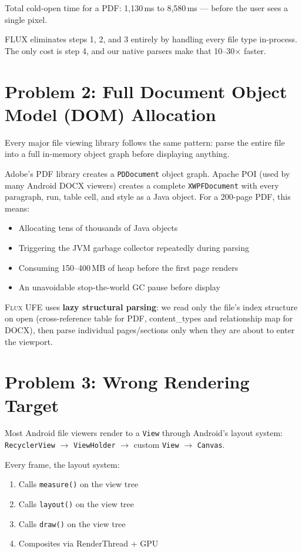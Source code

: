 \documentclass[11pt, a4paper, openright]{report}
\newcommand{\flux}{\textsc{Flux}}
\begin{document}
Total cold-open time for a PDF: 1,130\,ms to 8,580\,ms --- before the user sees a single pixel.

FLUX eliminates steps 1, 2, and 3 entirely by handling every file type in-process. The only cost is step 4, and our native parsers make that 10--30$\times$ faster.

\section{Problem 2: Full Document Object Model (DOM) Allocation}

Every major file viewing library follows the same pattern: parse the entire file into a full in-memory object graph before displaying anything.

Adobe's PDF library creates a \texttt{PDDocument} object graph. Apache POI (used by many Android DOCX viewers) creates a complete \texttt{XWPFDocument} with every paragraph, run, table cell, and style as a Java object. For a 200-page PDF, this means:

\begin{itemize}
  \item Allocating tens of thousands of Java objects
  \item Triggering the JVM garbage collector repeatedly during parsing
  \item Consuming 150--400\,MB of heap before the first page renders
  \item An unavoidable stop-the-world GC pause before display
\end{itemize}

\flux{} UFE uses \textbf{lazy structural parsing}: we read only the file's index structure on open (cross-reference table for PDF, content\_types and relationship map for DOCX), then parse individual pages/sections only when they are about to enter the viewport.

\section{Problem 3: Wrong Rendering Target}

Most Android file viewers render to a \texttt{View} through Android's layout system: \texttt{RecyclerView} $\to$ \texttt{ViewHolder} $\to$ custom \texttt{View} $\to$ \texttt{Canvas}.

Every frame, the layout system:
\begin{enumerate}
  \item Calls \texttt{measure()} on the view tree
  \item Calls \texttt{layout()} on the view tree
  \item Calls \texttt{draw()} on the view tree
  \item Composites via RenderThread + GPU
\end{enumerate}
\end{document}
